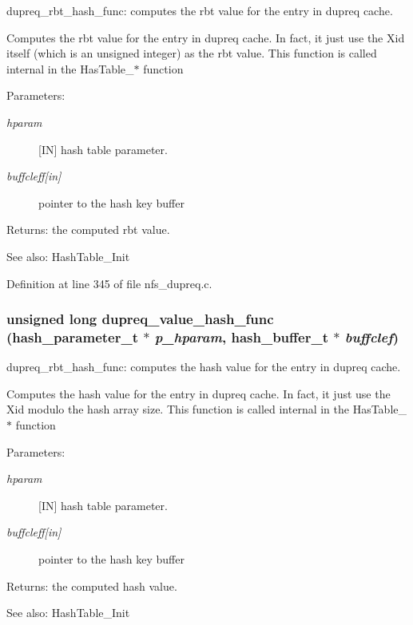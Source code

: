 dupreq\_\-rbt\_\-hash\_\-func: computes the rbt value for the entry in dupreq cache.

Computes the rbt value for the entry in dupreq cache. In fact, it just use the Xid itself (which is an unsigned integer) as the rbt value. This function is called internal in the HasTable\_\-$\ast$ function

\begin{Desc}
\item[Parameters:]
\begin{description}
\item[{\em hparam}][IN] hash table parameter. \item[{\em buffcleff\mbox{[}in\mbox{]}}]pointer to the hash key buffer\end{description}
\end{Desc}
\begin{Desc}
\item[Returns:]the computed rbt value.\end{Desc}
\begin{Desc}
\item[See also:]HashTable\_\-Init \end{Desc}


Definition at line 345 of file nfs\_\-dupreq.c.
\subsubsection[{dupreq\_\-value\_\-hash\_\-func}]{\setlength{\rightskip}{0pt plus 5cm}unsigned long dupreq\_\-value\_\-hash\_\-func (hash\_\-parameter\_\-t $\ast$ {\em p\_\-hparam}, \/  hash\_\-buffer\_\-t $\ast$ {\em buffclef})}\label{nfs__dupreq_8c_7363cd3531f6119e8a2047a57e51e08f}


dupreq\_\-rbt\_\-hash\_\-func: computes the hash value for the entry in dupreq cache.

Computes the hash value for the entry in dupreq cache. In fact, it just use the Xid modulo the hash array size. This function is called internal in the HasTable\_\-$\ast$ function

\begin{Desc}
\item[Parameters:]
\begin{description}
\item[{\em hparam}][IN] hash table parameter. \item[{\em buffcleff\mbox{[}in\mbox{]}}]pointer to the hash key buffer\end{description}
\end{Desc}
\begin{Desc}
\item[Returns:]the computed hash value.\end{Desc}
\begin{Desc}
\item[See also:]HashTable\_\-Init \end{Desc}


